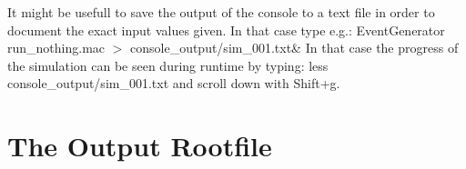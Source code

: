 \documentclass[12pt]{book}
\begin{document}
It might be usefull to save the output of the console to a text file in order to document the exact input values given. In that case type e.g.:\hfill{}
\linebreak \linebreak
{\ttfamily
EventGenerator run\_nothing.mac $>$ console\_output/sim\_001.txt\&
}
\linebreak \linebreak
In that case the progress of the simulation can be seen during runtime by typing:\hfill{}
\linebreak \linebreak
{\ttfamily
less console\_output/sim\_001.txt
}
\linebreak \linebreak
and scroll down with {\ttfamily Shift+g}.

\section{The Output Rootfile}
\end{document}

